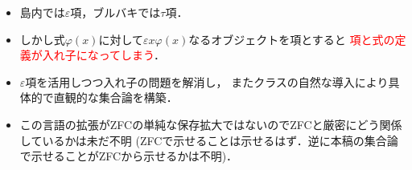 \begin{itemize}
		\item 島内では$\varepsilon$項，ブルバキでは$\tau$項．
			
		\item しかし式$\varphi(x)$に対して$\varepsilon x \varphi(x)$なるオブジェクトを項とすると
			\textcolor{red}{項と式の定義が入れ子になってしまう}．
			
\newpage
		\item $\varepsilon$項を活用しつつ入れ子の問題を解消し，
			またクラスの自然な導入により具体的で直観的な集合論を構築．
		
		\item この言語の拡張がZFCの単純な保存拡大ではないのでZFCと厳密にどう関係しているかは未だ不明
			(ZFCで示せることは示せるはず．逆に本稿の集合論で示せることがZFCから示せるかは不明)．
	\end{itemize}
	
